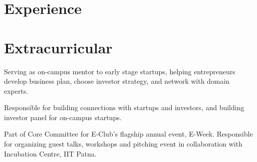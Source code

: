 \documentclass[]{deedy}%
\begin{document}
\begin{minipage}[t]{0.72\textwidth}
\section{Experience}%
%
%
%
\begin{tightemize}%
\item 
\end{tightemize}%
\sectionsep
%
%
%
%
\begin{tightemize}%
\item 
\end{tightemize}%
\sectionsep
%
\section{Extracurricular}%
%
%
%
\begin{tightemize}
\item Serving as on-campus mentor to early stage startups, helping entrepreneurs develop business plan, choose investor strategy, and network with domain experts.
\item Responsible for building connections with startups and investors, and building investor panel for on-campus startups.
\item Part of Core Committee for E-Club’s flagship annual event, E-Week. Responsible for organizing guest talks, workshops and pitching event in collaboration with Incubation Centre, IIT Patna.
\end{tightemize}
\sectionsep
%
\end{minipage}%
\end{document}
